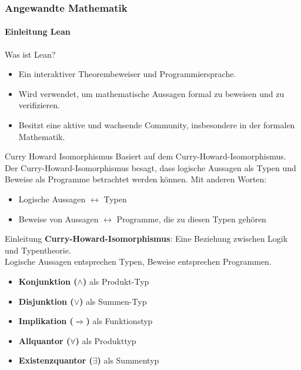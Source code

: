 \documentclass{beamer}
\begin{document}
\begin{frame}
    \frametitle{Angewandte Mathematik}
\framesubtitle{Einleitung Lean}
    \begin{block}{Was ist Lean?}
        \begin{itemize}
            \item Ein interaktiver Theorembeweiser und Programmiersprache.
            \item Wird verwendet, um mathematische Aussagen formal zu beweisen und zu verifizieren.
            \item Besitzt eine aktive und wachsende Community, insbesondere in der formalen Mathematik.
        \end{itemize}
    \end{block}

\begin{block}{Curry Howard Isomorphismus}
     Basiert auf dem Curry-Howard-Isomorphismus.
     Der Curry-Howard-Isomorphismus besagt, dass logische Aussagen als Typen und Beweise als Programme betrachtet werden können. Mit anderen Worten:
    \begin{itemize}
        \item Logische Aussagen $\leftrightarrow$ Typen
    
        \item Beweise von Aussagen $\leftrightarrow$  Programme, die zu diesen Typen gehören
    \end{itemize}
    \end{block}

 \end{frame}


\begin{frame}{Einleitung}
    \textbf{Curry-Howard-Isomorphismus}: Eine Beziehung zwischen Logik und Typentheorie. \\
    \vspace{0.5cm}
    Logische Aussagen entsprechen Typen, Beweise entsprechen Programmen. \\
    \vspace{0.5cm}
    \begin{itemize}
        \item \textbf{Konjunktion (\(\wedge\))} als Produkt-Typ
        \item \textbf{Disjunktion (\(\vee\))} als Summen-Typ
        \item \textbf{Implikation (\(\Rightarrow\))} als Funktionstyp
        \item \textbf{Allquantor (\(\forall\))} als Produkttyp
        \item \textbf{Existenzquantor (\(\exists\))} als Summentyp
    \end{itemize}
\end{frame}
\end{document}
